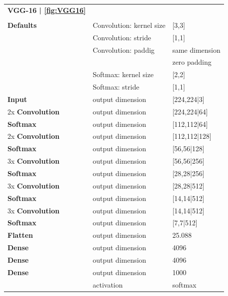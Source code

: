 \begin{tabularx}{\textwidth}{X X X}
	\multicolumn{1}{c}{\textbf{VGG-16 | \ref{fig:VGG16}}}\\
	\\
	\hline
	\endhead
	\textbf{Defaults} & Convolution: kernel size & [3,3]\\
	& Convolution: stride & [1,1]\\
	& Convolution: paddig & same dimension\\
	& & zero padding\\
	& Softmax: kernel size & [2,2]\\
	& Softmax: stride & [1,1]\\
	\hline
	\textbf{Input} & output dimension & [224,224|3]\\
	[8pt]
	2x \textbf{Convolution} & output dimension & [224,224|64]\\
	[8pt]
	\textbf{Softmax} & output dimension & [112,112|64]\\
	[8pt]
	2x \textbf{Convolution} & output dimension & [112,112|128]\\
	[8pt]
	\textbf{Softmax} & output dimension & [56,56|128]\\
	[8pt]
	3x \textbf{Convolution} & output dimension & [56,56|256]\\
	[8pt]
	\textbf{Softmax} & output dimension & [28,28|256]\\
	[8pt]
	3x \textbf{Convolution} & output dimension & [28,28|512]\\
	[8pt]
	\textbf{Softmax} & output dimension & [14,14|512]\\
	[8pt]
	3x \textbf{Convolution} & output dimension & [14,14|512]\\
	[8pt]
	\textbf{Softmax} & output dimension & [7,7|512]\\
	[8pt]
	\textbf{Flatten} & output dimension & 25.088\\
	[8pt]
	\textbf{Dense} & output dimension & 4096\\
	[8pt]
	\textbf{Dense} & output dimension & 4096\\
	[8pt]
	\textbf{Dense} & output dimension & 1000\\
	& activation & softmax\\
	\hline
\end{tabularx}



